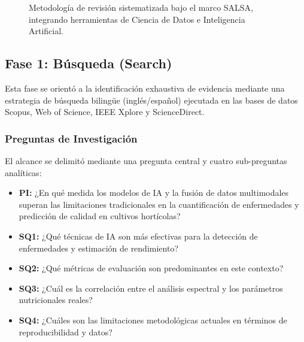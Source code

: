 \documentclass[agriculture,article,submit,pdftex,moreauthors]{Definitions/mdpi}
\begin{document}
\begin{figure}[h!]
\caption{Metodología de revisión sistematizada bajo el marco SALSA, integrando herramientas de Ciencia de Datos e Inteligencia Artificial.}
\label{fig:salsa_framework}
\end{figure}

\subsection{Fase 1: Búsqueda (Search)}
Esta fase se orientó a la identificación exhaustiva de evidencia mediante una estrategia de búsqueda bilingüe (inglés/español) ejecutada en las bases de datos Scopus, Web of Science, IEEE Xplore y ScienceDirect.

\subsubsection{Preguntas de Investigación}
El alcance se delimitó mediante una pregunta central y cuatro sub-preguntas analíticas:
\begin{itemize}
    \item \textbf{PI:} ¿En qué medida los modelos de IA y la fusión de datos multimodales superan las limitaciones tradicionales en la cuantificación de enfermedades y predicción de calidad en cultivos hortícolas? 
    \item \textbf{SQ1:} ¿Qué técnicas de IA son más efectivas para la detección de enfermedades y estimación de rendimiento? 
    \item \textbf{SQ2:} ¿Qué métricas de evaluación son predominantes en este contexto? 
    \item \textbf{SQ3:} ¿Cuál es la correlación entre el análisis espectral y los parámetros nutricionales reales? 
    \item \textbf{SQ4:} ¿Cuáles son las limitaciones metodológicas actuales en términos de reproducibilidad y datos? 
\end{itemize}
\end{document}
